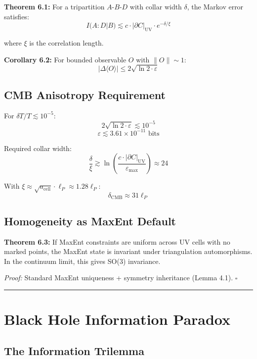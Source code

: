 \textbf{Theorem 6.1:} For a tripartition \(A\)-\(B\)-\(D\) with collar width \(\delta\), the Markov error satisfies: \[I(A:D|B) \lesssim c \cdot |\partial C|_{\text{UV}} \cdot e^{-\delta/\xi}\]

where \(\xi\) is the correlation length.

\textbf{Corollary 6.2:} For bounded observable \(O\) with \(\|O\| \sim 1\): \[|\Delta\langle O \rangle| \leq 2\sqrt{\ln 2 \cdot \varepsilon}\]

\subsection{CMB Anisotropy Requirement}\label{62-cmb-anisotropy-requirement}

For \(\delta T/T \lesssim 10^{-5}\): \[2\sqrt{\ln 2 \cdot \varepsilon} \lesssim 10^{-5}\] \[\varepsilon \lesssim 3.61 \times 10^{-11} \text{ bits}\]

Required collar width: \[\frac{\delta}{\xi} \gtrsim \ln\left(\frac{c \cdot |\partial C|_{\text{UV}}}{\varepsilon_{\text{max}}}\right) \approx 24\]

With \(\xi \approx \sqrt{a_{\text{cell}}} \cdot \ell_P \approx 1.28 \ell_P\): \[\delta_{\text{CMB}} \approx 31 \ell_P\]

\subsection{Homogeneity as MaxEnt Default}\label{63-homogeneity-as-maxent-default}

\textbf{Theorem 6.3:} If MaxEnt constraints are uniform across UV cells with no marked points, the MaxEnt state is invariant under triangulation automorphisms. In the continuum limit, this gives SO(3) invariance.

\emph{Proof:} Standard MaxEnt uniqueness + symmetry inheritance (Lemma 4.1). \(\square\)

\begin{center}\rule{0.5\linewidth}{0.5pt}\end{center}

\section{Black Hole Information Paradox}\label{7-black-hole-information-paradox}

\subsection{The Information Trilemma}\label{71-the-information-trilemma}

